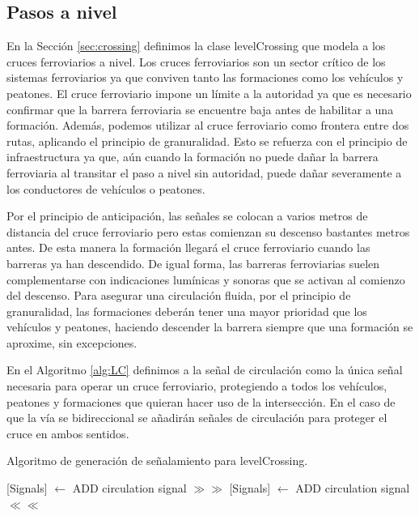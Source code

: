 \subsection{Pasos a nivel}

    
    En la Sección \ref{sec:crossing} definimos la clase levelCrossing que modela a los cruces ferroviarios a nivel. Los cruces ferroviarios son un sector crítico de los sistemas ferroviarios ya que conviven tanto las formaciones como los vehículos y peatones. El cruce ferroviario impone un límite a la autoridad ya que es necesario confirmar que la barrera ferroviaria se encuentre baja antes de habilitar a una formación. Además, podemos utilizar al cruce ferroviario como frontera entre dos rutas, aplicando el principio de granuralidad. Esto se refuerza con el principio de infraestructura ya que, aún cuando la formación no puede dañar la barrera ferroviaria al transitar el paso a nivel sin autoridad, puede dañar severamente a los conductores de vehículos o peatones.

    Por el principio de anticipación, las señales se colocan a varios metros de distancia del cruce ferroviario pero estas comienzan su descenso bastantes metros antes. De esta manera la formación llegará el cruce ferroviario cuando las barreras ya han descendido. De igual forma, las barreras ferroviarias suelen complementarse con indicaciones lumínicas y sonoras que se activan al comienzo del descenso. Para asegurar una circulación fluida, por el principio de granuralidad, las formaciones deberán tener una mayor prioridad que los vehículos y peatones, haciendo descender la barrera siempre que una formación se aproxime, sin excepciones.

    En el Algoritmo \ref{alg:LC} definimos a la señal de circulación como la única señal necesaria para operar un cruce ferroviario, protegiendo a todos los vehículos, peatones y formaciones que quieran hacer uso de la intersección. En el caso de que la vía se bidireccional se añadirán señales de circulación para proteger el cruce en ambos sentidos.

    \begin{algorithm}[hbt!]
        \caption{Algoritmo de generación de señalamiento para levelCrossing.}\label{alg:LC}
        \DontPrintSemicolon
        \SetNoFillComment
        \LinesNotNumbered 
        {
            [Signals] $\gets$ ADD circulation signal $\gg\gg$\;
            [Signals] $\gets$ ADD circulation signal $\ll\ll$\;
        }
        \KwResult{[Signals]} 
    \end{algorithm}    
    
